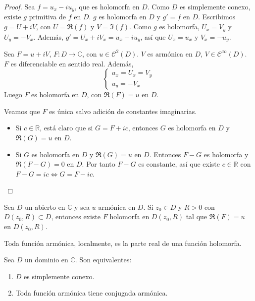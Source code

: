 \begin{proof}
    Sea $f = u_x - iu_y$, que es holomorfa en $D$.
    Como $D$ es simplemente conexo, existe $g$ primitiva de $f$ en $D$.
    $g$ es holomorfa en $D$ y $g' = f$ en $D$.
    Escribimos $g = U + iV$, con $U = \Re(f)$ y $V = \Im(f)$.
    Como $g$ es holomorfa, $U_x = V_y$ y $U_y = -V_x$.
    Además, $g' = U_x + iV_x = u_x - iu_y$, así que $U_x = u_x$ y $V_x = -u_y$.

    Sea $F = u + iV$, $F: D \to \mathbb{C}$, con $u \in \mathcal{C}^2(D)$.
    $V$ es armónica en $D$, $V \in \mathcal{C}^\infty(D)$.
    $F$ es diferenciable en sentido real.
    Además,
    $$\begin{cases}
            u_x = U_x = V_y \\
            u_y = -V_x
        \end{cases}$$
    Luego $F$ es holomorfa en $D$, con $\Re(F) = u$ en $D$.

    Veamos que $F$ es única salvo adición de constantes imaginarias.
    \begin{itemize}
        \item Si $c \in \mathbb{R}$, está claro que si $G = F + ic$, entonces $G$ es holomorfa en $D$ y $\Re(G) = u$ en $D$.
        \item Si $G$ es holomorfa en $D$ y $\Re(G) = u$ en $D$.
              Entonces $F-G$ es holomorfa y $\Re(F-G) = 0$ en $D$.
              Por tanto $F-G$ es constante, así que existe $c \in \mathbb{R}$ con $F-G = ic \Leftrightarrow G = F - ic$.
    \end{itemize}
\end{proof}

\begin{corollary}
    Sea $D$ un abierto en $\mathbb{C}$ y sea $u$ armónica en $D$.
    Si $z_0 \in D$ y $R > 0$ con $D(z_0, R) \subset D$, entonces existe $F$ holomorfa en $D(z_0, R)$ tal que $\Re(F) = u$ en $D(z_0, R)$.
\end{corollary}

Toda función armónica, localmente, es la parte real de una función holomorfa.

\begin{theorem}
    Sea $D$ un dominio en $\mathbb{C}$.
    Son equivalentes:
    \begin{enumerate}
        \item $D$ es simplemente conexo.
        \item Toda función armónica tiene conjugada armónica.
    \end{enumerate}
\end{theorem}

